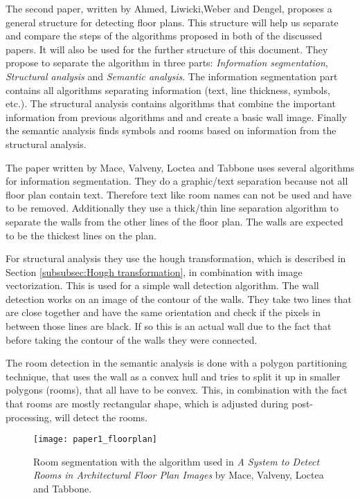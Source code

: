 The second paper, written by Ahmed, Liwicki,Weber and Dengel, proposes a general structure for detecting floor plans. This structure will help us separate and compare the steps of the algorithms proposed in both of the discussed papers. It will also be used for the further structure of this document. They propose to separate the algorithm in three parts: \textit{Information segmentation}, \textit{Structural analysis} and \textit{Semantic analysis}. The information segmentation part contains all algorithms separating information (text, line thickness, symbols, etc.). The structural analysis contains algorithms that combine the important information from previous algorithms and and create a basic wall image. Finally the semantic analysis finds symbols and rooms based on information from the structural analysis.

The paper written by Mace, Valveny, Loctea and Tabbone uses several algorithms for information segmentation. They do a graphic/text separation because not all floor plan contain text. Therefore text like room names can not be used and have to be removed. Additionally they use a thick/thin line separation algorithm to separate the walls from the other lines of the floor plan. The walls are expected to be the thickest lines on the plan.

For structural analysis they use the hough transformation, which is described in Section \ref{subsubsec:Hough transformation}, in combination with image vectorization. This is used for a simple wall detection algorithm. The wall detection works on an image of the contour of the walls. They take two lines that are close together and have the same orientation and check if the pixels in between those lines are black. If so this is an actual wall due to the fact that before taking the contour of the walls they were connected. 

The room detection in the semantic analysis is done with a polygon partitioning technique, that uses the wall as a convex hull and tries to split it up in smaller polygons (rooms), that all have to be convex. This, in combination with the fact that rooms are mostly rectangular shape, which is adjusted during post-processing, will detect the rooms.

\begin{figure}[H]
	\centering
	\texttt{[image: paper1\_floorplan]}
	\caption{Room segmentation with the algorithm used in \textit{A System to Detect Rooms in Architectural Floor Plan Images} by Mace, Valveny, Loctea and Tabbone. }
	\label{fig:paper1_floorplan}
\end{figure}

